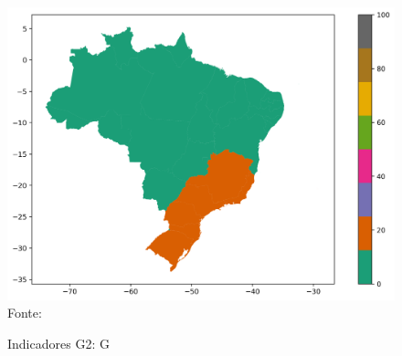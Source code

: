 \begin{figure}[H]
	\centering
	\caption{Indicadores G2: G}
	\includegraphics[width=1\linewidth]{figuras/mapa_coropleto_tic_domicilio_g2_G.png}
	\label{fig:mapa_coropleto_tic_domicilio_g2_G}
	\footnotesize{Fonte: \cite{tic_domicilios_2024_g2}}
\end{figure}